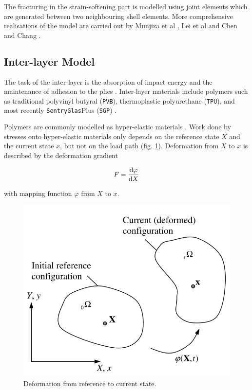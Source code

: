 \documentclass[12pt,twoside]{article}
\theoremstyle{break}
\begin{document}
The fracturing in the strain-softening part is modelled using joint elements which are generated between two neighbouring shell elements. More comprehensive realisations of the model are carried out by Munjiza et al \cite{Mun04}, Lei et al \cite{Lei16} and Chen and Chang \cite{Che18}.

\subsection{Inter-layer Model}

The task of the inter-layer is the absorption of impact energy and the maintenance of adhesion to the plies \cite{Wu14}. Inter-layer materials include polymers such as traditional polyvinyl butyral (\texttt{PVB}), thermoplastic polyurethane (\texttt{TPU}), and most recently \texttt{SentryGlas}\textregistered Plus (\texttt{SGP}) \cite{Moh18, Wan18}. 

\bigbreak
Polymers are commonly modelled as hyper-elastic materials \cite{Gha15, Kim15}. Work done by stresses onto hyper-elastic materials only depends on the reference state $X$ and the current state $x$, but not on the load path (fig. \ref{fig:deformation}). Deformation from $X$ to $x$ is described by the deformation gradient \cite{Gu07}

\begin{equation}
    \label{eq:defgrad}
    F = \frac{{\rm{d}}\varphi}{{\rm{d}}X}
\end{equation}

with mapping function $\varphi$ from $X$ to $x$.

\begin{figure}[!htbp]
    \centering
    \includegraphics[width=\textwidth*2/3]{Deformation}
    \caption{Deformation from reference to current state. \cite{Gu07}}
    \label{fig:deformation}
\end{figure}
\end{document}
